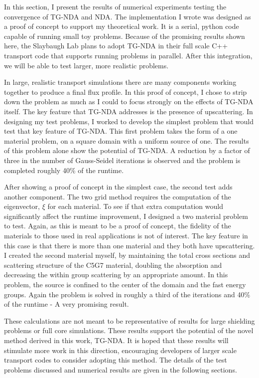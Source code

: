 
In this section, I present the results of numerical experiments testing the convergence of TG-NDA and NDA. The implementation I wrote was designed as a proof of concept to support my theoretical work. It is a serial, python code capable of running small toy problems. Because of the promising results shown here, the Slaybaugh Lab plans to adopt TG-NDA in their full scale C++ transport code that supports running problems in parallel. After this integration, we will be able to test larger, more realistic problems.

In large, realistic transport simulations there are many components working together to produce a final flux profile. In this proof of concept, I chose to strip down the problem as much as I could to focus strongly on the effects of TG-NDA itself. The key feature that TG-NDA addresses is the presence of upscattering. In designing my test problems, I worked to develop the simplest problem that would test that key feature of TG-NDA. This first problem takes the form of a one material problem, on a square domain with a uniform source of one. The results of this problem alone show the potential of TG-NDA. A reduction by a factor of three in the number of Gauss-Seidel iterations is observed and the problem is completed roughly 40\% of the runtime. 

After showing a proof of concept in the simplest case, the second test adds another component. The two grid method requires the computation of the eigenvector, $\xi$ for each material. To see if that extra computation would significantly affect the runtime improvement, I designed a two material problem to test. Again, as this is meant to be a proof of concept, the fidelity of the materials to those used in real applications is not of interest. The key feature in this case is that there is more than one material and they both have upscattering. I created the second material myself, by maintaining the total cross sections and scattering structure of the C5G7 material, doubling the absorption and decreasing the within group scattering by an appropriate amount. In this problem, the source is confined to the center of the domain and the fast energy groups. Again the problem is solved in roughly a third of the iterations and 40\% of the runtime - A very promising result. 

These calculations are not meant to be representative of results for large shielding problems or full core simulations. These results support the potential of the novel method derived in this work, TG-NDA. It is hoped that these results will stimulate more work in this direction, encouraging developers of larger scale transport codes to consider adopting this method. The details of the test problems discussed and numerical results are given in the following sections. 



